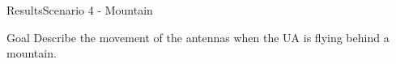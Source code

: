
\begin{frame}{Results}{Scenario 4 - Mountain}

  \begin{block}{Goal}
	Describe the movement of the antennas when the UA is flying behind a mountain.
  \end{block}

  \begin{figure}[H]
    \centerline{
    \hfill
    }
  \end{figure}

\end{frame}



